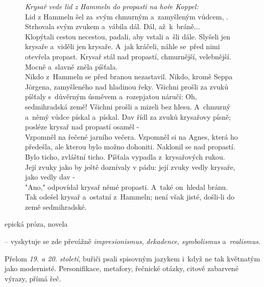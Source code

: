 \documentclass[FGBook.tex]{subfiles}
\begin{document}

\noindent\begin{figure}\footnotesize
{}
\setlength{\parindent}{3pt}
\textit{Krysař vede lid z Hammeln do propasti na hoře Koppel:}\\
Lid z Hammeln šel za~svým chmurným a~zamyšleným vůdcem, .
Strhovala svým zvukem a~vábila dál.
Dál, až~k~bráně...\\
Klopýtali cestou necestou, padali, aby vstali a~šli dále.
Slyšeli jen krysaře a~viděli jen krysaře.
A~jak kráčeli, náhle se~před nimi otevřela propast.
Krysař stál nad propastí, chmurnější, velebnější.
Mocně a~slavně zněla píšťala.\\
Nikdo z~Hammeln se před branou nezastavil.
Nikdo, kromě Seppa Jörgena, zamyšleného nad hladinou řeky.
Všichni prošli za zvuků píšťaly s~důvěrným úsměvem a~rozepjatou náručí:
Oh, sedmihradská země!
Všichni prošli a mizeli bez hlesu.
A~chmurný a~němý vůdce pískal a~pískal.
Dav řídl za zvuků krysařovy písně; posléze krysař nad propastí osaměl -\\
Vzpomněl na  řečené jarního večera.
Vzpomněl si na Agnes, která ho předešla, ale kterou bylo možno dohoniti.
Naklonil se nad propastí.\\
Bylo ticho, zvláštní ticho.
Píšťala vypadla z~krysařových rukou.
\\
Její zvuky jako by ještě doznívaly v pádu: její zvuky vedly krysaře, jako vedly dav -\\
"Ano," odpovídal krysař němé propasti.
A~také on~hledal bránu.\\
Tak odešel krysař a~ostatní z~Hammeln; není však jisté, došli-li do země sedmihradské.
\end{figure}


\noindent epická próza, novela

\noindent{} -- vyskytuje se zde převážně \textit{impresionismus}, \textit{dekadence},
\textit{symbolismus} a~\textit{realismus}.

\noindent Přelom \textit{19. a 20. století}, buřiči psali spisovným jazykem i~když ne tak květnatým jako modernisté.
Personifikace, metafory, řečnické otázky, citově zabarvené výrazy, přímá řeč.
\end{document}
